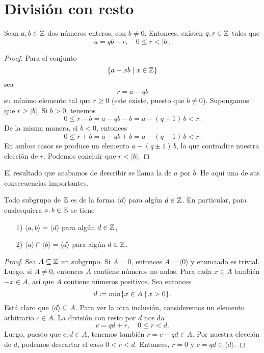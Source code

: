 \documentclass{article}
\numberwithin{equation}{section}
\begin{document}

\section{División con resto}

\begin{teorema}[Euclides]
  Sean $a,b\in\mathbb{Z}$ dos números enteros, con $b \ne 0$. Entonces, existen
  $q,r\in\mathbb{Z}$ tales que
  $$a = qb + r, \quad 0 \le r < |b|.$$

  \begin{proof}
    Para el conjunto
    $$\{ a - xb \mid x\in \mathbb{Z} \}$$
    sea
    $$r = a - qb$$
    su mínimo elemento tal que $r \ge 0$ (este existe, puesto que
    $b\ne 0$). Supongamos que $r \ge |b|$. Si $b > 0$, tenemos
    $$0 \le r - b = a - qb - b = a - (q+1)\,b < r.$$
    De la misma manera, si $b < 0$, entonces
    $$0 \le r + b = a - qb + b = a - (q-1)\,b < r.$$
    En ambos casos se produce un elemento $a - (q\pm 1)\,b$, lo que contradice
    nuestra elección de $r$. Podemos concluir que $r < |b|$.
  \end{proof}
\end{teorema}

El resultado que acabamos de describir se llama
la  de $a$ por $b$.
He aquí una de sus consecuencias importantes.

\begin{proposicion}
  \label{prop:Z-es-un-dominio-de-ideales-principales}
  Todo subgrupo de $\mathbb{Z}$ es de la forma $\langle d\rangle$ para algún
  $d\in \mathbb{Z}$. En particular, para cualesquiera $a,b\in\mathbb{Z}$ se tiene

  \begin{enumerate}
  \item[1)] $\langle a,b\rangle = \langle d\rangle$ para algún $d\in\mathbb{Z}$,

  \item[2)] $\langle a\rangle \cap \langle b\rangle = \langle d\rangle$ para
    algún $d\in\mathbb{Z}$.
  \end{enumerate}

  \begin{proof}
    Sea $A\subseteq \mathbb{Z}$ un subgrupo. Si $A = 0$, entonces
    $A = \langle 0\rangle$ y enunciado es trivial. Luego, si $A \ne 0$, entonces
    $A$ contiene números no nulos. Para cada $x\in A$ también $-x\in A$, así que
    $A$ contiene números positivos. Sea entonces
    $$d \mathrel{\mathop:}= \min \{ x\in A \mid x > 0 \}.$$
    Está claro que $\langle d\rangle \subseteq A$. Para ver la otra inclusión,
    consideremos un elemento arbitrario $c \in A$. La división con resto por $d$
    nos da
    $$c = qd + r, \quad 0 \le r < d.$$
    Luego, puesto que $c, d \in A$, tenemos también $r = c-qd \in A$.
    Por nuestra elección de $d$, podemos descartar el caso
    $0 < r < d$. Entonces, $r = 0$ y $c = qd \in \langle d\rangle$.
  \end{proof}
\end{proposicion}
\end{document}
